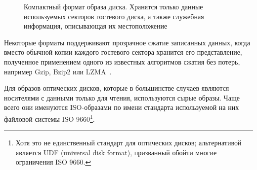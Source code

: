 \begin{figure}[htb]
	\centering
	\caption[Компактный формат образа диска]{Компактный формат образа диска. Хранятся только данные используемых секторов гостевого диска, а также служебная информация, описывающая их местоположение}
	\label{fig:compat}
\end{figure}

Некоторые форматы поддерживают прозрачное сжатие записанных данных, когда вместо обычной копии каждого гостевого сектора хранится его представление, полученное применением одного из известных алгоритмов сжатия без потерь, например Gzip, Bzip2 или LZMA~\cite{sayood2002lossless}.

Для образов оптических дисков, которые в большинстве  случаев являются носителями с данными только для чтения, используются сырые образы. Чаще всего они именуются ISO-образами по имени стандарта используемой на них файловой системы ISO 9660\footnote{Хотя это не единственный стандарт для оптических дисков; альтернативой является UDF (universal disk format), призванный обойти многие ограничения ISO 9660.}.


